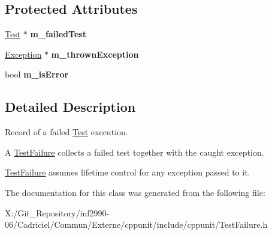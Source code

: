 \subsection*{Protected Attributes}
\begin{DoxyCompactItemize}
\item 
\hypertarget{class_test_failure_a2ba79089909967b45aedc4992b51553a}{\hyperlink{class_test}{Test} $\ast$ {\bfseries m\-\_\-failed\-Test}}\label{class_test_failure_a2ba79089909967b45aedc4992b51553a}

\item 
\hypertarget{class_test_failure_a96bfae3c1f32d0c1729501d68016f431}{\hyperlink{class_exception}{Exception} $\ast$ {\bfseries m\-\_\-thrown\-Exception}}\label{class_test_failure_a96bfae3c1f32d0c1729501d68016f431}

\item 
\hypertarget{class_test_failure_abf258e5bec289b51fb13147a62b8b75d}{bool {\bfseries m\-\_\-is\-Error}}\label{class_test_failure_abf258e5bec289b51fb13147a62b8b75d}

\end{DoxyCompactItemize}


\subsection{Detailed Description}
Record of a failed \hyperlink{class_test}{Test} execution.

A \hyperlink{class_test_failure}{Test\-Failure} collects a failed test together with the caught exception. 

\hyperlink{class_test_failure}{Test\-Failure} assumes lifetime control for any exception passed to it. 

The documentation for this class was generated from the following file\-:\begin{DoxyCompactItemize}
\item 
X\-:/\-Git\-\_\-\-Repository/inf2990-\/06/\-Cadriciel/\-Commun/\-Externe/cppunit/include/cppunit/Test\-Failure.\-h\end{DoxyCompactItemize}
